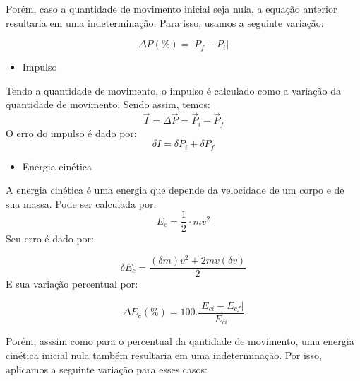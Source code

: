 \documentclass[12pt, twoside]{article}
\begin{document}
Porém, caso a quantidade de movimento inicial seja nula, a equação anterior resultaria em uma indeterminação. Para isso, usamos a seguinte variação:

        \begin{equation}
            \label{Materiais_percentual2_quantidade_de_movimento}
            \Delta{P}(\%) = |P_f - P_i| 
        \end{equation}

        \begin{itemize}
        \item Impulso
        \end{itemize}

Tendo a quantidade de movimento, o impulso é calculado como a variação da quantidade de movimento. Sendo assim, temos:
        \begin{equation}
        \label{Materiais_equacao_impulso}
            \vec{I} = \Delta \vec{P} = \vec{P}_i - \vec{P}_f
        \end{equation}
O erro do impulso é dado por:
\begin{equation}
        \label{Materiais_erro_equacao_impulso}
            \delta{I} =\delta{P}_i + \delta{P}_f
        \end{equation}


        \begin{itemize}
        \item Energia cinética
        \end{itemize}
A energia cinética é uma energia que depende da velocidade de um corpo e de sua massa. Pode ser calculada por:
        \begin{equation}
        \label{Materiais_energia_cinetica}
            E_c = \frac{1}{2}\cdot mv^2
        \end{equation}
Seu erro é dado por:

\begin{equation}
        \label{Materiais_erro_energia_cinetica}
            \delta E_c = \frac{(\delta m) v^2 + 2mv (\delta v)}{2}
        \end{equation}
E sua variação percentual por:

        \begin{equation}
        \label{Materiais_percentual1_energia_cinetica}
            \Delta{E_c}(\%) = 100 . \frac{|E_{ci} - E_{cf}|}{E_{ci}}
        \end{equation}

    Porém, asssim como para o percentual da qantidade de movimento, uma energia cinética inicial nula também resultaria em uma indeterminação. Por isso, aplicamos a seguinte variação para esses casos:
\end{document}
